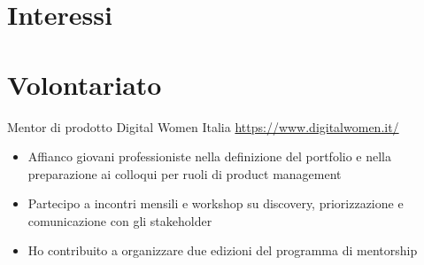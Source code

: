 \documentclass[a4paper, serif, 10pt]{moderncv}
\begin{document}
\section{Interessi}

\section{Volontariato}

        {Mentor di prodotto}
        {Digital Women Italia}
        {\url{https://www.digitalwomen.it/}}
        {}
        {\begin{itemize}
\item Affianco giovani professioniste nella definizione del portfolio e nella preparazione ai colloqui per ruoli di product management
\item Partecipo a incontri mensili e workshop su discovery, priorizzazione e comunicazione con gli stakeholder
\item Ho contribuito a organizzare due edizioni del programma di mentorship
\end{itemize}}
    
\end{document}
